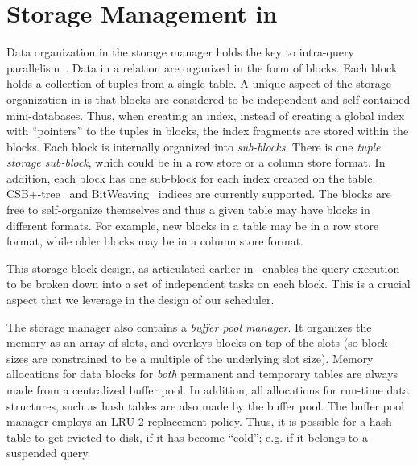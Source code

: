 \section{Storage Management in \sys{}}\label{sec:storage-manager}
Data organization in the \sys{} storage manager holds the key to intra-query 
parallelism~\cite{quickstep-storage}. 
Data in a relation are organized in the form of blocks. 
Each block holds a collection of tuples from a single table. 
A unique aspect of the storage organization in \sys{} is that blocks are considered to 
be independent and self-contained mini-databases. 
Thus, when creating an index, instead of creating a global index with 
``pointers'' to the tuples in blocks, the index fragments are stored within the blocks. 
Each block is internally organized into \textit{sub-blocks}. 
There is one \textit{tuple storage sub-block}, which could be in a row store or a 
column store format.
In addition, each block has one sub-block for each index created on the table. 
CSB+-tree~\cite{csb+-tree} and BitWeaving~\cite{bitweaving} 
indices are currently supported. 
The blocks are free to self-organize themselves and thus a given table may have blocks in different formats. 
For example, new blocks in a table may be in a row store format, while older blocks may 
be in a column store format.

This storage block design, as articulated earlier in~\cite{quickstep-storage} enables the query execution to be broken down into a set of independent tasks on each block. 
This is a crucial aspect that we leverage in the design of our scheduler. 

The storage manager also contains a \textit{buffer pool manager}. 
It organizes the memory as an array of slots, and overlays blocks on top of the slots (so block sizes are constrained to be a multiple of the underlying slot size). 
Memory allocations for data blocks for \textit{both} permanent and temporary tables are always made from a centralized buffer pool. 
In addition, all allocations for run-time data structures, such as hash tables are also made 
by the buffer pool. 
The buffer pool manager employs an LRU-2 replacement policy. 
Thus, it is possible for a hash table to get evicted to disk, if it has become ``cold''; e.g. if it belongs to a suspended query.


